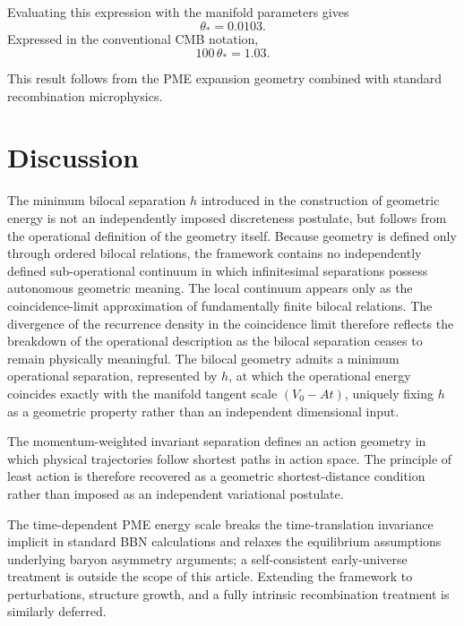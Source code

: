 \documentclass[fontsize=12pt, paper=a4]{scrartcl}
\begin{document}
Evaluating this expression with the manifold parameters gives
\begin{equation}
\theta_* = 0.0103.
\end{equation}
Expressed in the conventional CMB notation,
\begin{equation}
100\,\theta_* = 1.03.
\end{equation}

This result follows from the PME expansion geometry combined with standard recombination microphysics.

\section{Discussion}

The minimum bilocal separation $h$ introduced in the construction of geometric energy is not an independently imposed discreteness postulate, but follows from the operational definition of the geometry itself. Because geometry is defined only through ordered bilocal relations, the framework contains no independently defined sub-operational continuum in which infinitesimal separations possess autonomous geometric meaning. The local continuum appears only as the coincidence-limit approximation of fundamentally finite bilocal relations. The divergence of the recurrence density in the coincidence limit therefore reflects the breakdown of the operational description as the bilocal separation ceases to remain physically meaningful. The bilocal geometry admits a minimum operational separation, represented by $h$, at which the operational energy coincides exactly with the manifold tangent scale $(V_0 - At)$, uniquely fixing $h$ as a geometric property rather than an independent dimensional input.

The momentum-weighted invariant separation defines an action geometry in which physical trajectories follow shortest paths in action space. The principle of least action is therefore recovered as a geometric shortest-distance condition rather than imposed as an independent variational postulate.

The time-dependent PME energy scale breaks the time-translation invariance implicit in standard BBN calculations and relaxes the equilibrium assumptions underlying baryon asymmetry arguments; a self-consistent early-universe treatment is outside the scope of this article. Extending the framework to perturbations, structure growth, and a fully intrinsic recombination treatment is similarly deferred.
\end{document}
